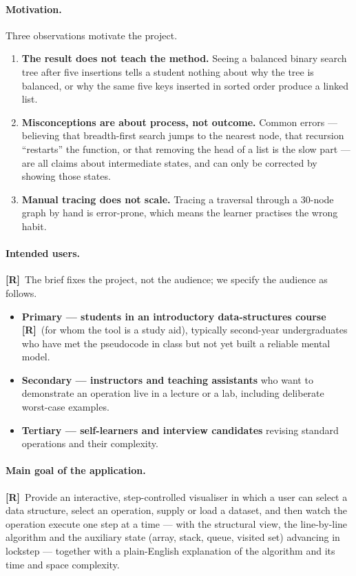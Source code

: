 \documentclass[11pt,a4paper]{article}
\newcommand{\R}{\textcolor{reqc}{\textbf{[R]}}}     %
\begin{document}
\paragraph{Motivation.} Three observations motivate the project.
\begin{enumerate}[leftmargin=1.6em,itemsep=2pt]
  \item \textbf{The result does not teach the method.} Seeing a balanced binary search
        tree after five insertions tells a student nothing about why the tree is balanced,
        or why the same five keys inserted in sorted order produce a linked list.
  \item \textbf{Misconceptions are about process, not outcome.} Common errors --- believing
        that breadth-first search jumps to the nearest node, that recursion ``restarts''
        the function, or that removing the head of a list is the slow part --- are all
        claims about intermediate states, and can only be corrected by showing those
        states.
  \item \textbf{Manual tracing does not scale.} Tracing a traversal through a 30-node graph
        by hand is error-prone, which means the learner practises the wrong habit.
\end{enumerate}

\paragraph{Intended users.} \R\ The brief fixes the project, not the audience; we specify
the audience as follows.
\begin{itemize}[leftmargin=1.6em,itemsep=2pt]
  \item \textbf{Primary --- students in an introductory data-structures course}
        \R\ (for whom the tool is a study aid), typically second-year undergraduates who
        have met the pseudocode in class but not yet built a reliable mental model.
  \item \textbf{Secondary --- instructors and teaching assistants} who want to demonstrate
        an operation live in a lecture or a lab, including deliberate worst-case examples.
  \item \textbf{Tertiary --- self-learners and interview candidates} revising standard
        operations and their complexity.
\end{itemize}

\paragraph{Main goal of the application.} \R\ Provide an interactive, step-controlled
visualiser in which a user can select a data structure, select an operation, supply or
load a dataset, and then watch the operation execute one step at a time --- with the
structural view, the line-by-line algorithm and the auxiliary state (array, stack, queue,
visited set) advancing in lockstep --- together with a plain-English explanation of the
algorithm and its time and space complexity.
\end{document}
